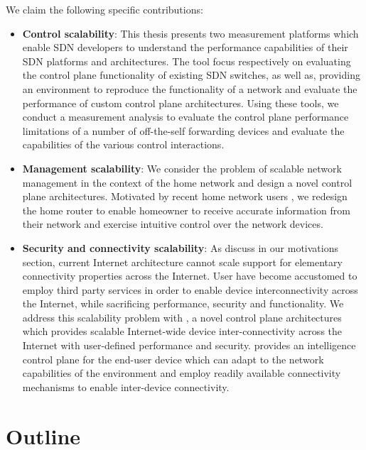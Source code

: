 We claim the following specific contributions:

\begin{itemize}
  \item \textbf{Control scalability}: This thesis presents two measurement
        platforms which enable SDN developers to understand the performance
        capabilities of their SDN platforms and architectures. The tool focus
        respectively on evaluating the control plane functionality of existing
        SDN switches, as well as, providing an environment to reproduce the
        functionality of a network and evaluate the performance of custom
        control plane architectures. Using these tools, we conduct a measurement
        analysis to evaluate the control plane performance limitations of a
        number of off-the-self forwarding devices and evaluate the capabilities
        of the various control interactions. 
  \item \textbf{Management scalability}: We consider the problem of scalable
        network management in the context of the home network and design a novel
        control plane architectures. Motivated by recent home network users , we
        redesign the home router to enable homeowner to receive accurate
        information from their network and exercise intuitive control over the
        network devices.
  \item \textbf{Security and connectivity scalability}: As discuss in our
        motivations section, current Internet architecture cannot scale support
        for elementary connectivity properties across the Internet. User have
        become accustomed to employ third party services in order to enable
        device interconnectivity across the Internet, while sacrificing
        performance, security and functionality. We address this scalability
        problem with \signpost, a novel control plane architectures which
        provides scalable Internet-wide device inter-connectivity across the
        Internet with user-defined performance and security. \signpost provides
        an intelligence control plane for the end-user device which can adapt to
        the network capabilities of the environment and employ readily available
        connectivity mechanisms to enable inter-device connectivity.
    \end{itemize}

\section{Outline} \label{sec:intro:outline}

